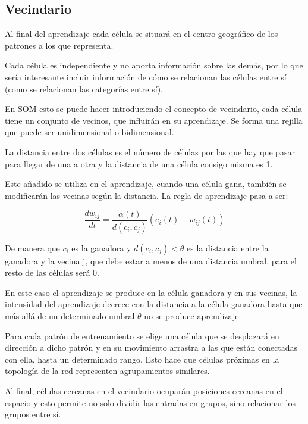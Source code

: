 \documentclass[12pt, twoside, openright]{report} %
\begin{document}
\subsection{Vecindario}
Al final del aprendizaje cada célula se situará en el centro geográfico de los patrones a los que representa.

Cada célula es independiente y no aporta información sobre las demás, por lo que sería interesante incluir información de cómo se relacionan las células entre sí (como se relacionan las categorías entre sí).

En SOM esto se puede hacer introduciendo el concepto de vecindario, cada célula tiene un conjunto de vecinos, que influirán en su aprendizaje. Se forma una rejilla que puede ser unidimensional o bidimensional.

La distancia entre dos células es el número de células por las que hay que pasar para llegar de una a otra y la distancia de una célula consigo misma es 1.

Este añadido se utiliza en el aprendizaje, cuando una célula gana, también se modificarán las vecinas según la distancia. La regla de aprendizaje pasa a ser:

$$\frac{dw_{ij}}{dt}=\frac{\alpha(t)}{d(c_i, c_j)} (e_i(t)-w_{ij}(t))$$

De manera que $c_i$ es la ganadora y $d(c_i, c_j)<\theta$ es la distancia entre la ganadora y la vecina j, que debe estar a menos de una distancia umbral, para el resto de las células será 0.

En este caso el aprendizaje se produce en la célula ganadora y en sus vecinas, la intensidad del aprendizaje decrece con la distancia a la célula ganadora hasta que más allá de un determinado umbral $\theta$ no se produce aprendizaje.

Para cada patrón de entrenamiento se elige una célula que se desplazará en dirección a dicho patrón y en su movimiento arrastra a las que están conectadas con ella, hasta un determinado rango. Esto hace que células próximas en la topología de la red representen agrupamientos similares.

Al final, células cercanas en el vecindario ocuparán posiciones cercanas en el espacio y esto permite no solo dividir las entradas en grupos, sino relacionar los grupos entre sí.
\end{document}
